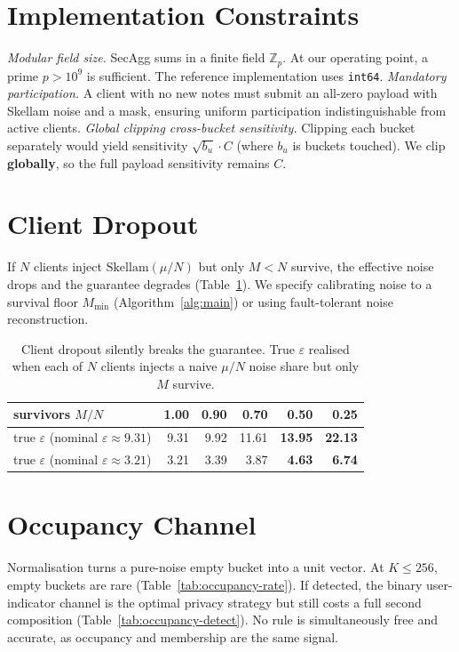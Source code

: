 \documentclass[conference]{IEEEtran}
\theoremstyle{remark}
\newcommand{\eps}{\varepsilon}
\newcommand{\Z}{\mathbb{Z}}
\begin{document}
\begin{appendices}
\section{Implementation Constraints}\label{sec:app-constraints}
\emph{Modular field size.} SecAgg sums in a finite field $\Z_p$. At our operating point, a prime $p > 10^{9}$ is sufficient. The reference implementation uses \texttt{int64}.
\emph{Mandatory participation.} A client with no new notes must submit an all-zero payload with Skellam noise and a mask, ensuring uniform participation indistinguishable from active clients.
\emph{Global clipping cross-bucket sensitivity.} Clipping each bucket separately would yield sensitivity $\sqrt{b_u} \cdot C$ (where $b_u$ is buckets touched). We clip \textbf{globally}, so the full payload sensitivity remains $C$.

\section{Client Dropout}\label{sec:app-dropout}
If $N$ clients inject $\mathrm{Skellam}(\mu/N)$ but only $M < N$ survive, the effective noise drops and the guarantee degrades (Table~\ref{tab:dropout}). We specify calibrating noise to a survival floor $M_{\min}$ (Algorithm~\ref{alg:main}) or using fault-tolerant noise reconstruction.

\begin{table}[t]
  \centering
  \caption{Client dropout silently breaks the guarantee. True $\eps$ realised when
  each of $N$ clients injects a naive $\mu/N$ noise share but only $M$ survive.}
  \label{tab:dropout}
  \begin{tabular}{@{}lrrrrr@{}}
    \toprule
    survivors $M/N$ & 1.00 & 0.90 & 0.70 & 0.50 & 0.25 \\
    \midrule
    true $\eps$ (nominal $\eps \approx 9.31$) & 9.31 & 9.92 & 11.61 & \textbf{13.95} & \textbf{22.13} \\
    true $\eps$ (nominal $\eps \approx 3.21$) & 3.21 & 3.39 &  3.87 & \textbf{4.63}  & \textbf{6.74}  \\
    \bottomrule
  \end{tabular}
\end{table}

\section{Occupancy Channel}\label{sec:app-occupancy}
Normalisation turns a pure-noise empty bucket into a unit vector. At $K \leq 256$, empty buckets are rare (Table~\ref{tab:occupancy-rate}). If detected, the binary user-indicator channel is the optimal privacy strategy but still costs a full second composition (Table~\ref{tab:occupancy-detect}). No rule is simultaneously free and accurate, as occupancy and membership are the same signal.


\end{appendices}
\end{document}
